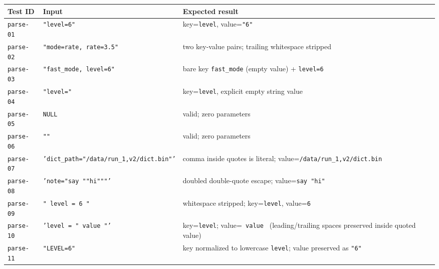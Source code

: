 \documentclass[../HDF5_RFC.tex]{subfiles}
\begin{document}
\begin{center}
\small
\renewcommand{\arraystretch}{1.25}
\begin{tabularx}{\textwidth}{l>{\raggedright\arraybackslash\hsize=0.7\hsize}X>{\raggedright\arraybackslash\hsize=1.3\hsize}X}
\toprule
\textbf{Test ID} & \textbf{Input} & \textbf{Expected result} \\
\midrule
\texttt{parse-01} & \texttt{"level=6"}
  & key=\texttt{level}, value=\texttt{"6"} \\
\texttt{parse-02} & \texttt{"mode=rate, rate=3.5"}
  & two key-value pairs; trailing whitespace stripped \\
\texttt{parse-03} & \texttt{"fast\_mode, level=6"}
  & bare key \texttt{fast\_mode} (empty value) + \texttt{level=6} \\
\texttt{parse-04} & \texttt{"level="}
  & key=\texttt{level}, explicit empty string value \\
\texttt{parse-05} & \texttt{NULL}
  & valid; zero parameters \\
\texttt{parse-06} & \texttt{""}
  & valid; zero parameters \\
\texttt{parse-07} & \texttt{'dict\_path="/data/run\_1,v2/dict.bin"'}
  & comma inside quotes is literal; value=\texttt{/data/run\_1,v2/dict.bin} \\
\texttt{parse-08} & \texttt{'note="say ""hi"""'}
  & doubled double-quote escape; value=\texttt{say "hi"} \\
\texttt{parse-09} & \texttt{"  level  =  6  "}
  & whitespace stripped; key=\texttt{level}, value=\texttt{6} \\
\texttt{parse-10} & \texttt{'level = " value "'}
  & key=\texttt{level}; value=\texttt{\ value\ } (leading/trailing spaces preserved inside quoted value) \\
\texttt{parse-11} & \texttt{"LEVEL=6"}
  & key normalized to lowercase \texttt{level}; value preserved as \texttt{"6"} \\
\bottomrule
\end{tabularx}
\end{center}

\end{document}
